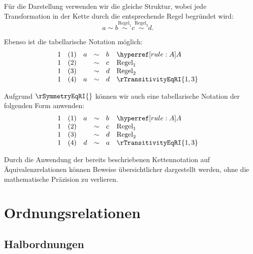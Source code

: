 \documentclass[main.tex]{subfiles}
\begin{document}
Für die Darstellung verwenden wir die gleiche Struktur, wobei jede Transformation in der Kette durch die entsprechende Regel begründet wird:
\[
a \sim b \stackrel{\text{Regel}_1}{\sim} c \stackrel{\text{Regel}_2}{\sim} d.
\]

Ebenso ist die tabellarische Notation möglich:
\[
\begin{array}{llclll}
	1 & (1) & a & \sim & b & \rA \\
	1 & (2) &   & \sim & c & \text{Regel}_1 \\
	1 & (3) &   & \sim & d & \text{Regel}_2 \\
        1 & (4) & a & \sim & d & \rTransitivityEqRI{1,3} \\
\end{array}
\]

Aufgrund \(\rSymmetryEqRI{}\) können wir auch eine tabellarische Notation der folgenden Form anwenden:
\[
\begin{array}{llclll}
	1 & (1) & a & \sim & b & \rA \\
	1 & (2) &   & \sim & c & \text{Regel}_1 \\
	1 & (3) &   & \sim & d & \text{Regel}_2 \\
        1 & (4) & d & \sim & a & \rTransitivityEqRI{1,3} \\
\end{array}
\]

\begin{remark}
    Durch die Anwendung der bereits beschriebenen Kettennotation auf Äquivalenzrelationen können Beweise übersichtlicher dargestellt werden, ohne die mathematische Präzision zu verlieren.
\end{remark}

\section{Ordnungsrelationen}

\subsection{Halbordnungen}
\end{document}
